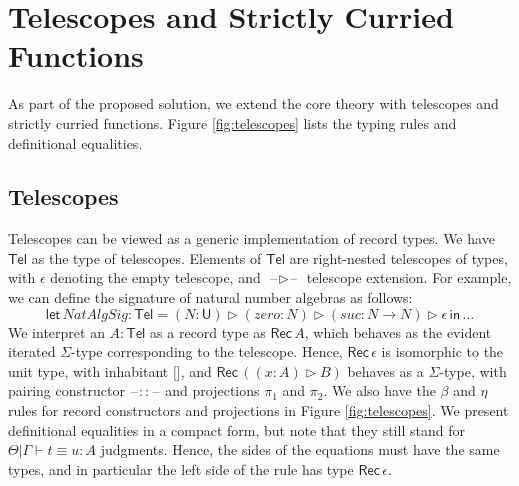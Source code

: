 \documentclass[acmsmall,review,anonymous,prologue,dvipsnames]{acmart}\settopmatter{printfolios=true,printccs=false,printacmref=false}
\newcommand{\slet}{\boldsymbol{\mathsf{let}}}
\renewcommand{\sin}{\boldsymbol{\mathsf{in}}}
\renewcommand{\U}{\mathsf{U}}
\newcommand{\blank}{\mathord{\hspace{1pt}\text{--}\hspace{1pt}}}
\newcommand{\Tel}{\mathsf{Tel}}
\newcommand{\TCons}{\triangleright}
\newcommand{\Rec}{\mathsf{Rec}}
\theoremstyle{remark}
\begin{document}
\section{Telescopes and Strictly Curried Functions}

As part of the proposed solution, we extend the core theory with telescopes and
strictly curried functions. Figure \ref{fig:telescopes} lists the typing rules and
definitional equalities.

\subsection{Telescopes}
Telescopes can be viewed as a generic implementation of record types. We have
$\Tel$ as the type of telescopes. Elements of $\Tel$ are right-nested telescopes
of types, with $\epsilon$ denoting the empty telescope, and $\blank\TCons\blank$
telescope extension. For example, we can define the signature of natural number
algebras as follows:
\[
  \slet\,NatAlgSig : \Tel = (N : \U) \TCons (zero : N) \TCons (suc : N \to N) \TCons \epsilon\,\sin\,...
\]
We interpret an $A : \Tel$ as a record type as $\Rec\,A$, which behaves as the
evident iterated $\Sigma$-type corresponding to the telescope. Hence,
$\Rec\,\epsilon$ is isomorphic to the unit type, with inhabitant ${[}{]}$, and
$\Rec\,((x : A) \TCons B)$ behaves as a $\Sigma$-type, with pairing constructor
$\blank::\blank$ and projections $\pi_1$ and $\pi_2$. We also have the $\beta$
and $\eta$ rules for record constructors and projections in Figure
\ref{fig:telescopes}. We present definitional equalities in a compact form, but
note that they still stand for $\boxed{\Theta|\Gamma\vdash t \equiv u : A}$
judgments. Hence, the sides of the equations must have the same types, and in
particular the left side of the \LabTirName{${[}{]}$-$\eta$} rule has type
$\Rec\,\epsilon$.
\end{document}
